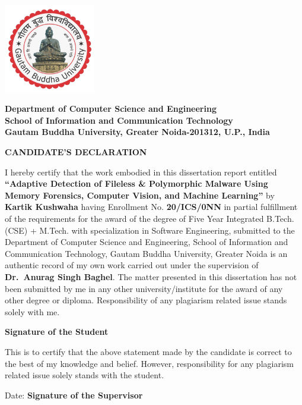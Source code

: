 \begin{center}
	\vspace*{-1.5cm}
	\includegraphics[width=4cm]{figures/GBU_logo.png} %

	{\normalsize
		\textbf{Department of Computer Science and Engineering\\
			School of Information and Communication Technology\\
			Gautam Buddha University,
			Greater Noida-201312, U.P., India
		}}\\  %

	\vspace{1cm} %

  {\LARGE\textbf{CANDIDATE'S DECLARATION}} %

\end{center}
{
\setlength{\baselineskip}{20pt}

I hereby certify that the work embodied in this dissertation report entitled
\textbf{``Adaptive Detection of Fileless \& Polymorphic Malware Using Memory Forensics, Computer Vision, and Machine Learning''} by \textbf{Kartik Kushwaha} having Enrollment No. \textbf{20/ICS/0NN} in partial fulfillment of the requirements for the award of the degree of Five Year Integrated B.Tech.(CSE) + M.Tech. with specialization in Software Engineering, submitted to the Department of Computer Science and Engineering, School of Information and Communication Technology, Gautam Buddha University, Greater Noida is an authentic record of my own work carried out under the supervision of \textbf{Dr.~Anurag Singh Baghel}. The matter presented in this dissertation has not been submitted by me in any other university/institute for the award of any other degree or diploma.
Responsibility of any plagiarism related issue stands solely with me.

\vspace{1cm} %

\hfill \textbf{Signature of the Student}

This is to certify that the above statement made by the candidate is correct to the best of my knowledge and belief. However, responsibility for any plagiarism related issue solely stands with the student.

\vspace{1cm} %

Date: \hfill \textbf{Signature of the Supervisor}

}
